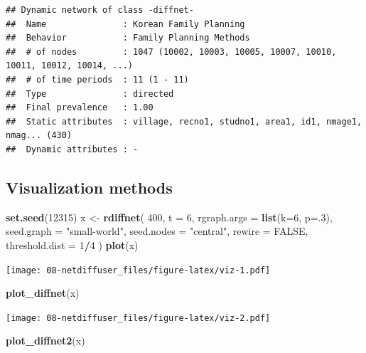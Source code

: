 \documentclass[]{book}
\newenvironment{Shaded}{\begin{snugshade}}{\end{snugshade}}
\newcommand{\DataTypeTok}[1]{\textcolor[rgb]{0.13,0.29,0.53}{#1}}
\newcommand{\DecValTok}[1]{\textcolor[rgb]{0.00,0.00,0.81}{#1}}
\newcommand{\KeywordTok}[1]{\textcolor[rgb]{0.13,0.29,0.53}{\textbf{#1}}}
\newcommand{\NormalTok}[1]{#1}
\newcommand{\OperatorTok}[1]{\textcolor[rgb]{0.81,0.36,0.00}{\textbf{#1}}}
\newcommand{\OtherTok}[1]{\textcolor[rgb]{0.56,0.35,0.01}{#1}}
\newcommand{\StringTok}[1]{\textcolor[rgb]{0.31,0.60,0.02}{#1}}
\begin{document}
\begin{itemize}
\begin{verbatim}
## Dynamic network of class -diffnet-
##  Name               : Korean Family Planning
##  Behavior           : Family Planning Methods
##  # of nodes         : 1047 (10002, 10003, 10005, 10007, 10010, 10011, 10012, 10014, ...)
##  # of time periods  : 11 (1 - 11)
##  Type               : directed
##  Final prevalence   : 1.00
##  Static attributes  : village, recno1, studno1, area1, id1, nmage1, nmag... (430)
##  Dynamic attributes : -
\end{verbatim}
\end{itemize}

\hypertarget{visualization-methods}{%
\subsection{Visualization methods}\label{visualization-methods}}

\begin{Shaded}
\begin{Highlighting}[]
\KeywordTok{set.seed}\NormalTok{(}\DecValTok{12315}\NormalTok{)}
\NormalTok{x <-}\StringTok{ }\KeywordTok{rdiffnet}\NormalTok{(}
  \DecValTok{400}\NormalTok{, }\DataTypeTok{t =} \DecValTok{6}\NormalTok{, }\DataTypeTok{rgraph.args =} \KeywordTok{list}\NormalTok{(}\DataTypeTok{k=}\DecValTok{6}\NormalTok{, }\DataTypeTok{p=}\NormalTok{.}\DecValTok{3}\NormalTok{),}
  \DataTypeTok{seed.graph =} \StringTok{"small-world"}\NormalTok{,}
  \DataTypeTok{seed.nodes =} \StringTok{"central"}\NormalTok{, }\DataTypeTok{rewire =} \OtherTok{FALSE}\NormalTok{, }\DataTypeTok{threshold.dist =} \DecValTok{1}\OperatorTok{/}\DecValTok{4}
\NormalTok{  )}
\KeywordTok{plot}\NormalTok{(x)}
\end{Highlighting}
\end{Shaded}

\texttt{[image: 08-netdiffuser\_files/figure-latex/viz-1.pdf]}

\begin{Shaded}
\begin{Highlighting}[]
\KeywordTok{plot_diffnet}\NormalTok{(x)}
\end{Highlighting}
\end{Shaded}

\texttt{[image: 08-netdiffuser\_files/figure-latex/viz-2.pdf]}

\begin{Shaded}
\begin{Highlighting}[]
\KeywordTok{plot_diffnet2}\NormalTok{(x)}
\end{Highlighting}
\end{Shaded}
\end{document}
